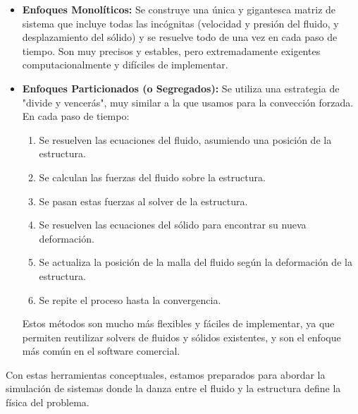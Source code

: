 \begin{itemize}
    \item \textbf{Enfoques Monolíticos:} Se construye una única y gigantesca matriz de sistema que incluye todas las incógnitas (velocidad y presión del fluido, y desplazamiento del sólido) y se resuelve todo de una vez en cada paso de tiempo. Son muy precisos y estables, pero extremadamente exigentes computacionalmente y difíciles de implementar.
    \item \textbf{Enfoques Particionados (o Segregados):} Se utiliza una estrategia de "divide y vencerás", muy similar a la que usamos para la convección forzada. En cada paso de tiempo:
    \begin{enumerate}
        \item Se resuelven las ecuaciones del fluido, asumiendo una posición de la estructura.
        \item Se calculan las fuerzas del fluido sobre la estructura.
        \item Se pasan estas fuerzas al solver de la estructura.
        \item Se resuelven las ecuaciones del sólido para encontrar su nueva deformación.
        \item Se actualiza la posición de la malla del fluido según la deformación de la estructura.
        \item Se repite el proceso hasta la convergencia.
    \end{enumerate}
    Estos métodos son mucho más flexibles y fáciles de implementar, ya que permiten reutilizar solvers de fluidos y sólidos existentes, y son el enfoque más común en el software comercial.
\end{itemize}
Con estas herramientas conceptuales, estamos preparados para abordar la simulación de sistemas donde la danza entre el fluido y la estructura define la física del problema.